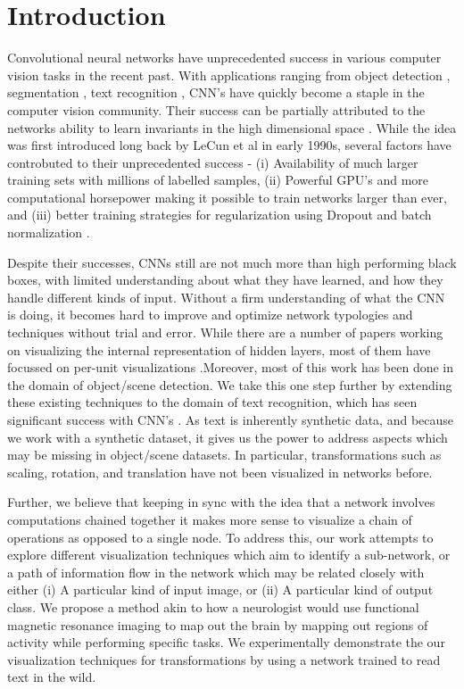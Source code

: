 \documentclass[10pt,twocolumn,letterpaper]{article}
\begin{document}
\section{Introduction}
Convolutional neural networks have unprecedented success in various computer vision tasks in the recent past.  With applications ranging from object detection \cite{}, segmentation \cite{}, text recognition \cite{}, CNN's have quickly become a staple in the computer vision community. Their success can be partially attributed to the networks ability to learn invariants in the high dimensional space \cite{}. While the idea was first introduced long back by LeCun et al in early 1990s, several factors have controbuted to their unprecedented success - (i) Availability of much larger training sets with millions of labelled samples, (ii) Powerful GPU's and more computational horsepower making it possible to train networks larger than ever, and (iii) better training strategies for regularization using Dropout \cite{wan2013regularization} and batch normalization \cite{ioffe2015batch}.

Despite their successes, CNNs still are not much more than high performing black boxes, with limited understanding about what they have learned, and how they handle different kinds of input. Without a firm understanding of what the CNN is doing, it becomes hard to improve and optimize network typologies and techniques without trial and error. While there are a number of papers working on visualizing the internal representation of hidden layers, most of them have focussed on per-unit visualizations \cite{yosinski2015understanding,mahendran2015understanding,zhou2014object}.Moreover, most of this work has been done in the domain of object/scene detection. We take this one step further by extending these existing techniques to the domain of text recognition, which has seen significant success with CNN's \cite{Jaderberg14,Jaderberg14c,Jaderberg14d}. As text is inherently synthetic data, and because we work with a synthetic dataset, it gives us the power to address aspects which may be missing in object/scene datasets. In particular, transformations such as scaling, rotation, and translation have not been visualized in networks before. 

Further, we believe that keeping in sync with the idea that a network involves computations chained together it makes more sense to visualize a chain of operations as opposed to a single node. To address this, our work attempts to  explore different visualization techniques which aim to identify a sub-network, or a path of information flow in the network which may be related closely with either (i) A particular kind of input image, or (ii) A particular kind of output class. We propose a method akin to how a neurologist would use functional magnetic resonance imaging to map out the brain by mapping out regions of activity while performing specific tasks.\cite{friston1998event} We experimentally demonstrate the our visualization techniques for transformations by using a network trained to read text in the wild. 
\end{document}
